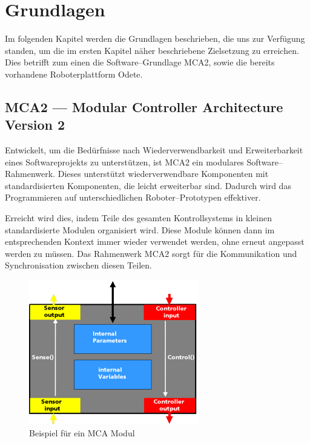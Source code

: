 \chapter{Grundlagen}
\label{grundlagen_cha}

Im folgenden Kapitel werden die Grundlagen beschrieben, die uns zur Verfügung standen,
 um die im ersten Kapitel näher beschriebene Zielsetzung zu erreichen. Dies betrifft zum einen die
 Software--Grundlage MCA2, sowie die bereits vorhandene Roboterplattform Odete.

\section{MCA2 --- Modular Controller Architecture Version 2}
\authorsection{\editoranne}

Entwickelt, um die Bedürfnisse nach Wiederverwendbarkeit und Erweiterbarkeit eines Softwareprojekts zu unterstützen,
 ist MCA2 ein modulares Software--Rahmenwerk. Dieses unterstützt wiederverwendbare Komponenten mit standardisierten Komponenten,
 die leicht erweiterbar sind. Dadurch wird das Programmieren auf unterschiedlichen Roboter--Prototypen effektiver.

Erreicht wird dies, indem Teile des gesamten Kontrollsystems in kleinen standardisierte Modulen organisiert wird.
 Diese Module können dann im entsprechenden Kontext immer wieder verwendet werden, ohne erneut angepasst werden zu müssen.
 Das Rahmenwerk MCA2 sorgt für die Kommunikation und Synchronisation zwischen diesen Teilen.

\begin{figure}[h]
	\center
	\includegraphics[scale=2.0]{graphics/mcamodule.png}
	\caption{\label{fig:MCA-Modul} Beispiel für ein MCA Modul}
\end{figure}

